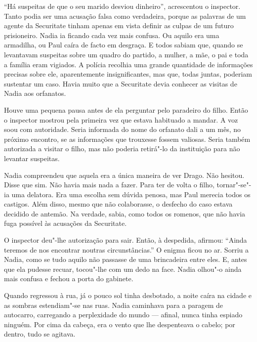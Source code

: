 ``Há suspeitas de que o seu marido desviou dinheiro'',
acrescentou o inspector. Tanto podia ser uma acusação falsa como
verdadeira, porque as palavras de um agente da Securitate tinham apenas
em vista definir as culpas de um futuro prisioneiro. Nadia ia ficando
cada vez mais confusa. Ou aquilo era uma armadilha, ou Paul caíra de
facto em desgraça. E todos sabiam que, quando se levantavam suspeitas
sobre um quadro do partido, a mulher, a
mãe, o pai e toda a família eram vigiados. A polícia recolhia uma
grande quantidade de informações precisas sobre ele, aparentemente
insignificantes, mas que, todas juntas, poderiam sustentar um caso.
Havia muito que a Securitate devia conhecer as visitas de Nadia aos
orfanatos.

Houve uma pequena pausa antes de ela perguntar pelo paradeiro do filho.
Então o inspector mostrou pela primeira vez que estava habituado a
mandar. A voz soou com autoridade. Seria informada do nome do orfanato
dali a um mês, no próximo encontro, se as informações que trouxesse
fossem valiosas. Seria também autorizada a visitar o filho, mas não
poderia retirá"-lo da instituição para não levantar suspeitas.

Nadia compreendeu que aquela era a única maneira de ver Drago. Não
hesitou. Disse que sim. Não havia mais nada a fazer. Para ter de volta o
filho, tornar"-se"-ia uma delatora. Era uma escolha sem dúvida penosa, mas
Paul merecia todos os castigos. Além disso, mesmo que não colaborasse, o
desfecho do caso estava decidido de antemão. Na verdade, sabia, como
todos os romenos, que não havia fuga possível às acusações da
Securitate.

O inspector deu"-lhe autorização para sair. Então, à despedida,
afirmou: ``Ainda teremos de nos encontrar noutras circunstâncias.'' O
enigma ficou no ar. Sorriu a Nadia, como se tudo aquilo não passasse de
uma brincadeira entre eles. E, antes que ela pudesse recuar, tocou"-lhe
com um dedo na face. Nadia olhou"-o ainda mais confusa e fechou a porta
do gabinete.

Quando regressou à rua, já o pouco sol tinha desbotado, a noite caíra
na cidade e as sombras estendiam"-se nas
ruas. Nadia caminhava para a paragem de autocarro, carregando a
perplexidade do mundo --- afinal, nunca tinha espiado ninguém. Por cima
da cabeça, era o vento que lhe despenteava o cabelo; por dentro, tudo se
agitava.


